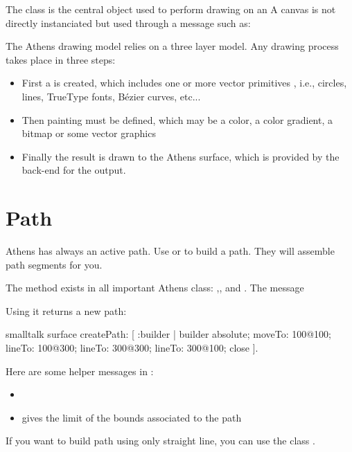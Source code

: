 \documentclass[10pt,twoside,english]{_support/latex/sbabook/sbabook}
\begin{document}
The class  is the central object used to perform drawing on an 
A canvas is not directly instanciated but used through a message such as:

The Athens drawing model relies on a three layer model. Any drawing process
takes place in three steps:

\begin{itemize}
    \item First a  is created, which includes one or more vector primitives , i.e., circles, lines, TrueType fonts, B\'{e}zier curves, etc...
    \item Then painting must be defined, which may be a color, a color gradient, a bitmap or some vector graphics
    \item Finally the result is drawn to the Athens surface, which is provided by the back-end for the output.
\end{itemize}

\section{Path}
Athens has always an active path.
Use  or  to build a path.
They will assemble path segments for you.

The method  exists in all important Athens class: ,, and  .
The message 

Using it returns a new path:
\begin{displaycode}{smalltalk}
surface createPath: [ :builder |
 builder
  absolute;
  moveTo: 100@100;
  lineTo: 100@300;
  lineTo: 300@300;
  lineTo: 300@100;
  close ].
\end{displaycode}

Here are some helper messages in :

\begin{itemize}
    \item {}
    \item {} gives the limit of the bounds associated to the path
\end{itemize}

If you want to build path using only straight line, you can use the class .
\end{document}

